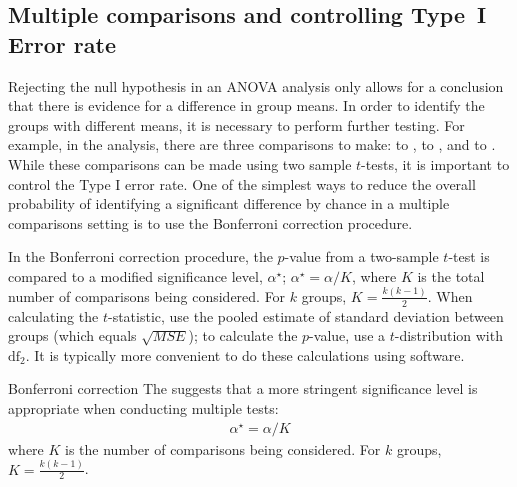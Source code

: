 \subsection{Multiple comparisons and controlling Type~I Error rate}
\label{multipleComparisonsAndControllingTheType1ErrorRate}


Rejecting the null hypothesis in an ANOVA analysis only allows for a conclusion that there is evidence for a difference in group means. In order to identify the groups with different means, it is necessary to perform further testing. For example, in the  analysis, there are three comparisons to make:  to ,  to , and  to . While these comparisons can be made using two sample $t$-tests, it is important to control the Type I error rate. One of the simplest ways to reduce the overall probability of identifying a significant difference by chance in a multiple comparisons setting is to use the Bonferroni correction procedure.

In the Bonferroni correction procedure, the $p$-value from a two-sample $t$-test is compared to a modified significance level, $\alpha^\star$; $\alpha^\star = \alpha/K$, where $K$ is the total number of comparisons being considered. For $k$ groups, $K=\frac{k(k-1)}{2}$. When calculating the $t$-statistic, use the pooled estimate of standard deviation between groups (which equals $\sqrt{MSE}$); to calculate the $p$-value, use a $t$-distribution with $\textrm{df}_2$. It is typically more convenient to do these calculations using software. 

\begin{onebox}{Bonferroni correction}
The  suggests that a more stringent significance level is appropriate when conducting multiple tests:
\begin{align*}
\alpha^\star = \alpha / K
\end{align*}
where $K$ is the number of comparisons being considered. For $k$ groups, $K=\frac{k(k-1)}{2}$.
\end{onebox}

